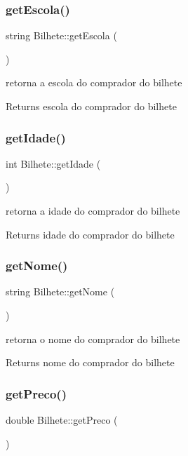 \subsubsection{\texorpdfstring{get\+Escola()}{getEscola()}}
{\footnotesize\ttfamily string Bilhete\+::get\+Escola (\begin{DoxyParamCaption}{ }\end{DoxyParamCaption})}

retorna a escola do comprador do bilhete \begin{DoxyReturn}{Returns}
escola do comprador do bilhete 
\end{DoxyReturn}
\mbox{\label{class_bilhete_aa63d79d55516bdb158ffc9e8abaff93c}} 
\subsubsection{\texorpdfstring{get\+Idade()}{getIdade()}}
{\footnotesize\ttfamily int Bilhete\+::get\+Idade (\begin{DoxyParamCaption}{ }\end{DoxyParamCaption})}

retorna a idade do comprador do bilhete \begin{DoxyReturn}{Returns}
idade do comprador do bilhete 
\end{DoxyReturn}
\mbox{\label{class_bilhete_acd970616a71c2eaf21b0d616a7a5f7aa}} 
\subsubsection{\texorpdfstring{get\+Nome()}{getNome()}}
{\footnotesize\ttfamily string Bilhete\+::get\+Nome (\begin{DoxyParamCaption}{ }\end{DoxyParamCaption})}

retorna o nome do comprador do bilhete \begin{DoxyReturn}{Returns}
nome do comprador do bilhete 
\end{DoxyReturn}
\mbox{\label{class_bilhete_af8800b8f21428964d446d2cb0747e9d8}} 
\subsubsection{\texorpdfstring{get\+Preco()}{getPreco()}}
{\footnotesize\ttfamily double Bilhete\+::get\+Preco (\begin{DoxyParamCaption}{ }\end{DoxyParamCaption})}

